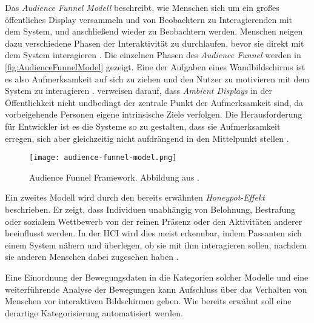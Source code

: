 Das \emph{Audience Funnel Modell} \citep{wouters_uncovering_2016, mai_audience_2018} beschreibt,
wie Menschen sich um ein großes öffentliches Display versammeln
und von Beobachtern zu Interagierenden mit dem System, und anschließend wieder zu Beobachtern werden.
Menschen neigen dazu verschiedene Phasen der Interaktivität zu durchlaufen,
bevor sie direkt mit dem System interagieren \citep{wouters_uncovering_2016, mai_audience_2018}.
Die einzelnen Phasen des \emph{Audience Funnel} werden in \autoref{fig:AudienceFunnelModel} gezeigt.
Eine der Aufgaben eines Wandbildschirms ist es also Aufmerksamkeit auf sich zu ziehen
und den Nutzer zu motivieren mit dem System zu interagieren \citep{mai_audience_2018}.
\citet{mai_audience_2018} verweisen darauf, dass \emph{Ambient Displays} in der Öffentlichkeit
nicht undbedingt der zentrale Punkt der Aufmerksamkeit sind, da vorbeigehende Personen eigene intrinsische Ziele verfolgen.
Die Herausforderung für Entwickler ist es die Systeme so zu gestalten,
dass sie Aufmerksamkeit erregen, sich aber gleichzeitig nicht aufdrängend in den Mittelpunkt stellen \citep{mai_audience_2018}.
\begin{figure}[ht]
    \begin{center}
    \texttt{[image: audience-funnel-model.png]}
    \end{center}
    \caption{Audience Funnel Framework. Abbildung aus \citet{mai_audience_2018}.}
    \label{fig:AudienceFunnelModel}
  \end{figure}

Ein zweites Modell wird durch den bereits erwähnten \emph{Honeypot-Effekt} beschrieben.
Er zeigt, dass Individuen unabhängig von Belohnung, Bestrafung oder sozialem Wettbewerb
von der reinen Präsenz oder den Aktivitäten anderer beeinflusst werden.
In der \ac{HCI} wird dies meist erkennbar, indem Passanten sich einem System nähern
und überlegen, ob sie mit ihm interagieren sollen,
nachdem sie anderen Menschen dabei zugesehen haben \citep{wouters_uncovering_2016}.

Eine Einordnung der Bewegungsdaten in die Kategorien solcher Modelle
und eine weiterführende Analyse der Bewegungen kann Aufschluss über das Verhalten von Menschen
vor interaktiven Bildschirmen geben.
Wie bereits erwähnt soll eine derartige Kategorisierung automatisiert werden.

